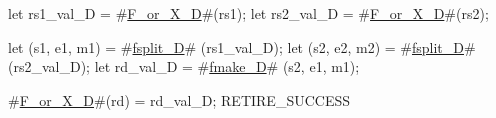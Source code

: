let rs1_val_D    = #\hyperref[sailRISCVzFzyorzyXzyD]{F\_or\_X\_D}#(rs1);
let rs2_val_D    = #\hyperref[sailRISCVzFzyorzyXzyD]{F\_or\_X\_D}#(rs2);

let (s1, e1, m1) = #\hyperref[sailRISCVzfsplitzyD]{fsplit\_D}# (rs1_val_D);
let (s2, e2, m2) = #\hyperref[sailRISCVzfsplitzyD]{fsplit\_D}# (rs2_val_D);
let rd_val_D     = #\hyperref[sailRISCVzfmakezyD]{fmake\_D}# (s2, e1, m1);

#\hyperref[sailRISCVzFzyorzyXzyD]{F\_or\_X\_D}#(rd) = rd_val_D;
RETIRE_SUCCESS
